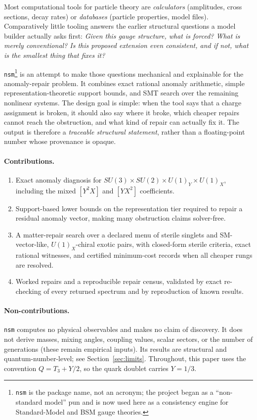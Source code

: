 \documentclass[11pt]{article}
\newcommand{\nsm}{\texttt{nsm}}
\newcommand{\UX}{U(1)_X}
\begin{document}
Most computational tools for particle theory are \emph{calculators} (amplitudes,
cross sections, decay rates) or \emph{databases} (particle properties, model
files). Comparatively little tooling answers the earlier structural questions a
model builder actually asks first: \emph{Given this gauge structure, what is
forced? What is merely conventional? Is this proposed extension even
consistent, and if not, what is the smallest thing that fixes it?}

\nsm{}\footnote{\nsm{} is the package name, not an acronym; the project began
as a ``non-standard model'' pun and is now used here as a consistency engine for
Standard-Model and BSM gauge theories.} is an attempt to make those questions
mechanical and explainable for the anomaly-repair problem. It combines exact
rational anomaly arithmetic, simple representation-theoretic support bounds, and
SMT search over the remaining nonlinear systems. The design goal is simple: when
the tool says that a charge assignment is broken, it should also say where it
broke, which cheaper repairs cannot reach the obstruction, and what kind of
repair can actually fix it. The output is therefore a \emph{traceable structural
statement}, rather than a floating-point number whose provenance is opaque.

\paragraph{Contributions.}
\begin{enumerate}
\item Exact anomaly diagnosis for
$SU(3)\times SU(2)\times U(1)_Y\times U(1)_X$, including the mixed $[Y^2X]$ and
$[YX^2]$ coefficients.
\item Support-based lower bounds on the representation tier required to repair a
residual anomaly vector, making many obstruction claims solver-free.
\item A matter-repair search over a declared menu of sterile
singlets and SM-vector-like, $\UX$-chiral exotic pairs, with closed-form sterile
criteria, exact rational witnesses, and certified minimum-cost records when all
cheaper rungs are resolved.
\item Worked repairs and a reproducible repair census, validated by exact
re-checking of every returned spectrum and by reproduction of known results.
\end{enumerate}

\paragraph{Non-contributions.}
\nsm{} computes no physical observables and makes no claim of discovery. It does
not derive masses, mixing angles, coupling values, scalar sectors, or the number
of generations (these remain empirical inputs). Its results are structural and
quantum-number-level; see Section~\ref{sec:limits}. Throughout, this paper uses the
convention $Q = T_3 + Y/2$, so the quark doublet carries $Y = 1/3$.
\end{document}
